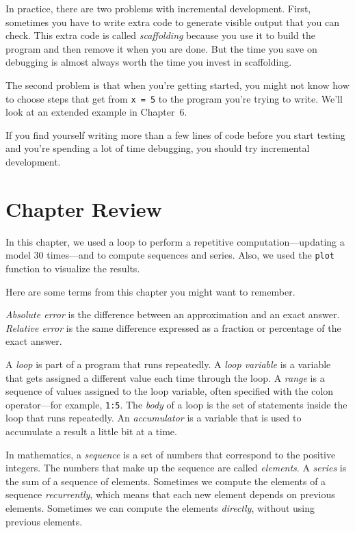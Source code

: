 In practice, there are two problems with incremental development. 
First, sometimes you have to write extra code to
generate visible output that you can check.  This extra code is
called \emph{scaffolding} because you use it to build the program
and then remove it when you are done.  But the time you save on
debugging is almost always worth the time you invest in
scaffolding.

The second problem is that when you're getting started, you might not know how to
choose steps that get from \lstinline{x = 5} to the program you're trying
to write.  We'll look at an extended example in Chapter~6.

If you find yourself writing more than a few lines of code before
you start testing and you're spending a lot of time debugging,
you should try incremental development.




\section{Chapter Review}

In this chapter, we used a loop to perform a repetitive computation---updating a model 30 times---and to compute sequences and series.  Also, \linebreak we used the \lstinline{plot} function to visualize the results.

Here are some terms from this chapter you might want to remember.

\emph{Absolute error} is the difference between an approximation and
an exact answer. \emph{Relative error} is the same difference expressed as a fraction or percentage of the exact answer.

A \emph{loop} is part of a program that runs repeatedly.
A \emph{loop variable} is a variable that gets assigned a different value each time through the loop.
A \emph{range} is a sequence of values assigned to the loop variable, often
specified with the colon operator---for example, \lstinline{1:5}.
The \emph{body} of a loop is the set of statements inside the loop that runs repeatedly.
An \emph{accumulator} is a variable that is used to accumulate a result a little bit at a time.

In mathematics, a \emph{sequence} is a set of numbers that correspond
to the positive integers.
The numbers that make up the sequence are called \mbox{\emph{elements}}.  
A \emph{series} is the sum of a sequence of elements.
Sometimes we compute the elements of a sequence \emph{recurrently}, which means that each new element depends on previous elements.  Sometimes we can compute the elements \emph{directly}, without using previous elements.

